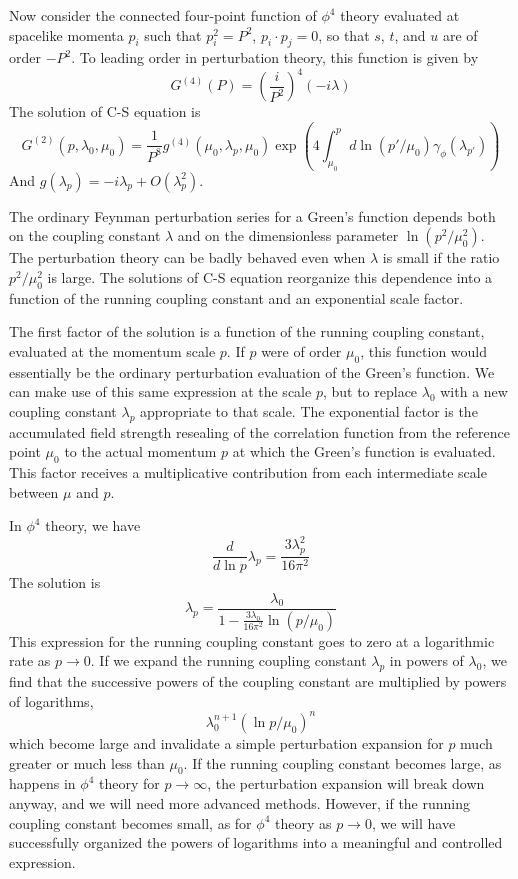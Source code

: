 Now consider the connected four-point function of $\phi^4$ theory evaluated at spacelike momenta $p_i$ such that $p_i^2= P^2$, $p_i \cdot p_j = 0$, so that $s$, $t$, and $u$ are of order $-P^2$. To leading order in perturbation theory, this function is given by
\[G^{(4)}(P) = \left (\frac{i}{P^2}\right )^4 (-i\lambda)\]
The solution of C-S equation is
\[G^{(2)}(p,\lambda_0,\mu_0) =  \frac{1}{P^8} g^{(4)}(\mu_0,\lambda_p,\mu_0)\exp \left (4\int_{\mu_0}^{p} d \ln(p'/\mu_0)  \gamma_{\phi}(\lambda_{p'}) \right )\]
And $g(\lambda_p) = -i\lambda_p + O(\lambda_p^2)$.

The ordinary Feynman perturbation series for a Green's function depends both on the coupling constant $\lambda$ and on the dimensionless parameter $\ln(p^2/\mu_0^2)$. The perturbation theory can be badly behaved even when $\lambda$ is small if the ratio $p^2/\mu_0^2$ is large. The solutions of C-S equation reorganize this dependence into a function of the running coupling constant and an exponential scale factor. 

The first factor of the solution is a function of the running coupling constant, evaluated at the momentum scale $p$. If $p$ were of order $\mu_0$, this function would essentially be the ordinary perturbation evaluation of the Green's function. We can make use of this same expression at the scale $p$, but to replace $\lambda_0$ with a new coupling constant $\lambda_p$ appropriate to that scale.
The exponential factor is the accumulated field strength resealing of the correlation function from the reference point $\mu_0$ to the actual momentum $p$ at which the Green's function is evaluated. This factor receives a multiplicative contribution from each intermediate scale between $\mu$ and $p$.

In $\phi^4$ theory, we have
\[\frac{d}{d\ln p} \lambda_p = \frac{3\lambda_p^2}{16\pi^2}\]
The solution is
\[\lambda_p = \frac{\lambda_0}{1 - \frac{3\lambda_0}{16\pi^2} \ln (p/\mu_0)}\]
This expression for the running coupling constant goes to zero at a logarithmic rate as $p \to 0$. If we expand the running coupling constant $\lambda_p$ in powers of $\lambda_0$, we find that the successive powers of the coupling constant are multiplied by powers of logarithms, 
\[\lambda_0^{n+1}(\ln p/\mu_0)^n\]
which become large and invalidate a simple perturbation expansion for $p$ much greater or much less than $\mu_0$. If the running coupling constant becomes large, as happens in $\phi^4$ theory for $p \to \infty$, the perturbation expansion will break down anyway, and we will need more advanced methods. However, if the running coupling constant becomes small, as for $\phi^4$ theory as $p \to 0$, we will have successfully organized the powers of logarithms into a meaningful and controlled expression.

